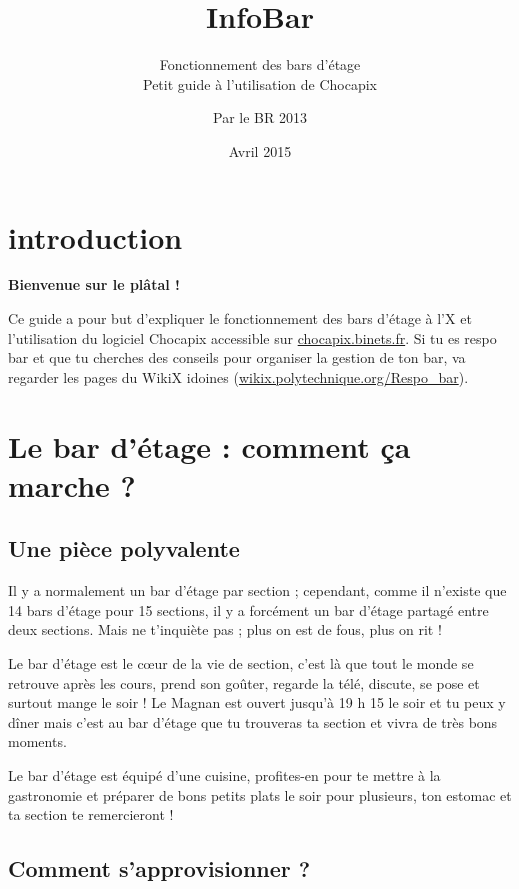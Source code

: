\documentclass[12pt,french]{article}
\title{InfoBar}
\subtitle{Fonctionnement des bars d'étage\\Petit guide à l'utilisation de Chocapix}
\author{Par le BR 2013}
\date{Avril 2015}
\begin{document}
\maketitle

\section*{introduction}

\begin{center}
\bfseries Bienvenue sur le plâtal ! 
\end{center}

Ce guide a pour but d'expliquer le fonctionnement des bars d'étage à l'X et l'utilisation du logiciel Chocapix accessible sur \url{chocapix.binets.fr}. Si tu es respo bar et que tu cherches des conseils pour organiser la gestion de ton bar, va regarder les pages du WikiX idoines (\url{wikix.polytechnique.org/Respo_bar}).


\tableofcontents

\clearpage

\section{Le bar d'étage : comment ça marche ?}

\subsection{Une pièce polyvalente}

Il y a normalement un bar d'étage par section ; cependant, comme il n'existe que 14 bars d'étage pour 15 sections, il y a forcément un bar d'étage partagé entre deux sections. Mais ne t'inquiète pas ; plus on est de fous, plus on rit !

Le bar d'étage est le cœur de la vie de section, c'est là que tout le monde se retrouve après les cours, prend son goûter, regarde la télé, discute, se pose et surtout mange le soir ! Le Magnan est ouvert jusqu'à 19 h 15 le soir et tu peux y dîner mais c'est au bar d'étage que tu trouveras ta section et vivra de très bons moments.

Le bar d'étage est équipé d'une cuisine, profites-en pour te mettre à la gastronomie et préparer de bons petits plats le soir pour plusieurs, ton estomac et ta section te remercieront ! 

\subsection{Comment s'approvisionner ?}
\end{document}
